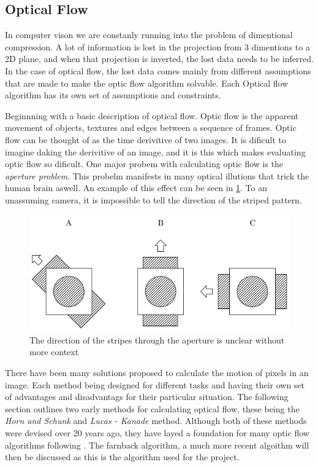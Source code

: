 \documentclass{UoNMCHA}
\numberwithin{equation}{section}
\begin{document}
\subsection{Optical Flow}
In computer vison we are constanly running into the problem of dimentional compression. A lot of information is lost in the projection from 3 dimentions to a 2D plane, and when that projection is inverted, the lost data needs to be inferred. In the case of optical flow, the lost data comes mainly from different assumptions that are made to make the optic flow algorithm solvable. Each Optical flow algorithm has its own set of assumptions and constraints.

Beginnning with a basic description of optical flow. Optic flow is the apparent movement of objects, textures and edges between a sequence of frames. Optic flow can be thought of as the time derivitive of two images. It is dificult to imagine daking the derivitive of an image, and it is this which makes evaluating optic flow so dificult. One major probem with calculating optic flow is the \textit{aperture problem}. This probelm manifests in many optical illutions that trick the human brain aswell. An example of this effect can be seen in \ref{fig:ApertureProblem}. To an unassuming camera, it is impossible to tell the direction of the striped pattern.

\begin{figure}[ht]
    \begin{center}
        \includegraphics[width=.6\linewidth]{Figures/ApertureProblem}
        \caption{The direction of the stripes through the aperture is unclear without more context}
        \label{fig:ApertureProblem}
    \end{center}
\end{figure}


There have been many solutions proposed to calculate the motion of pixels in an image. Each method being designed for different tasks and having their own set of advantages and disadvantags for their particular situation. The following section outlines two  early methods for calculating optical flow, these being the \textit{Horn and Schunk} and \textit{Lucas - Kanade} method. Although both of these methods were devised over 20 years ago, they have layed a foundation for many optic flow algorithms following \citep{sun2010secrets}. The farnback algorithm, a much more recent algoithm will then be discussed as this is the algorithm used for the project.
\end{document}
